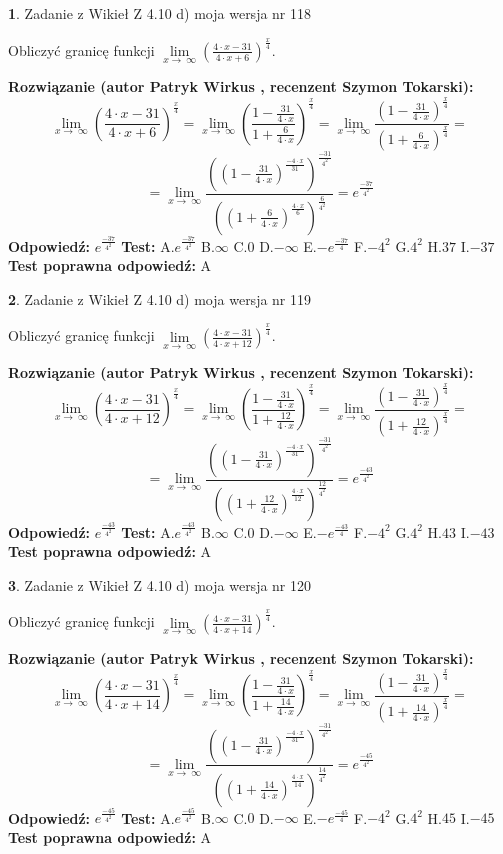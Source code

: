 \documentclass[12pt, a4paper]{article}
\theoremstyle{definition} %
\newtheorem{zad}{}
\newcommand{\zadStart}[1]{\begin{zad}#1\newline}
\newcommand{\zadStop}{\end{zad}}
\newcommand{\rozwStart}[2]{\noindent \textbf{Rozwiązanie (autor #1 , recenzent #2): }\newline}
\newcommand{\rozwStop}{\newline}
\newcommand{\odpStart}{\noindent \textbf{Odpowiedź:}\newline}
\newcommand{\odpStop}{\newline}
\newcommand{\testStart}{\noindent \textbf{Test:}\newline}
\newcommand{\testStop}{\newline}
\newcommand{\kluczStart}{\noindent \textbf{Test poprawna odpowiedź:}\newline}
\newcommand{\kluczStop}{\newline}
\begin{document}
\zadStart{Zadanie z Wikieł Z 4.10 d) moja wersja nr 118}


Obliczyć granicę funkcji  $\lim\limits_{x\to\ \infty}(\frac{4\cdot x-31}{4\cdot x+6})^{\frac{x}{4}}$.
\zadStop
\rozwStart{Patryk Wirkus}{Szymon Tokarski}
$$\lim\limits_{x\to\ \infty}(\frac{4\cdot x-31}{4\cdot x+6})^{\frac{x}{4}} = \lim\limits_{x\to\ \infty}(\frac{1-\frac{31}{4\cdot x}}{1+\frac{6}{4\cdot x}})^{\frac{x}{4}}=\lim\limits_{x\to\ \infty}\frac{(1-\frac{31}{4\cdot x})^{\frac{x}{4}}}{(1+\frac{6}{4\cdot x})^{\frac{x}{4}}}=$$
$$=\lim\limits_{x\to\ \infty}\frac{((1-\frac{31}{4\cdot x})^{\frac{-4\cdot x}{31}})^{\frac{-31}{4^{2}}}}{((1+\frac{6}{4\cdot x})^{\frac{4\cdot x}{6}})^{\frac{6}{4^{2}}}}=e^{\frac{-37}{4^{2}}}$$
\rozwStop
\odpStart
$e^{\frac{-37}{4^{2}}}$
\odpStop
\testStart
A.$e^{\frac{-37}{4^{2}}}$ B.$\infty$ C.$0$ D.$-\infty$ E.$-e^{\frac{-37}{4}}$
F.$-4^{2}$ G.$4^{2}$
H.$37$
I.$-37$
\testStop
\kluczStart
A
\kluczStop



\zadStart{Zadanie z Wikieł Z 4.10 d) moja wersja nr 119}


Obliczyć granicę funkcji  $\lim\limits_{x\to\ \infty}(\frac{4\cdot x-31}{4\cdot x+12})^{\frac{x}{4}}$.
\zadStop
\rozwStart{Patryk Wirkus}{Szymon Tokarski}
$$\lim\limits_{x\to\ \infty}(\frac{4\cdot x-31}{4\cdot x+12})^{\frac{x}{4}} = \lim\limits_{x\to\ \infty}(\frac{1-\frac{31}{4\cdot x}}{1+\frac{12}{4\cdot x}})^{\frac{x}{4}}=\lim\limits_{x\to\ \infty}\frac{(1-\frac{31}{4\cdot x})^{\frac{x}{4}}}{(1+\frac{12}{4\cdot x})^{\frac{x}{4}}}=$$
$$=\lim\limits_{x\to\ \infty}\frac{((1-\frac{31}{4\cdot x})^{\frac{-4\cdot x}{31}})^{\frac{-31}{4^{2}}}}{((1+\frac{12}{4\cdot x})^{\frac{4\cdot x}{12}})^{\frac{12}{4^{2}}}}=e^{\frac{-43}{4^{2}}}$$
\rozwStop
\odpStart
$e^{\frac{-43}{4^{2}}}$
\odpStop
\testStart
A.$e^{\frac{-43}{4^{2}}}$ B.$\infty$ C.$0$ D.$-\infty$ E.$-e^{\frac{-43}{4}}$
F.$-4^{2}$ G.$4^{2}$
H.$43$
I.$-43$
\testStop
\kluczStart
A
\kluczStop



\zadStart{Zadanie z Wikieł Z 4.10 d) moja wersja nr 120}


Obliczyć granicę funkcji  $\lim\limits_{x\to\ \infty}(\frac{4\cdot x-31}{4\cdot x+14})^{\frac{x}{4}}$.
\zadStop
\rozwStart{Patryk Wirkus}{Szymon Tokarski}
$$\lim\limits_{x\to\ \infty}(\frac{4\cdot x-31}{4\cdot x+14})^{\frac{x}{4}} = \lim\limits_{x\to\ \infty}(\frac{1-\frac{31}{4\cdot x}}{1+\frac{14}{4\cdot x}})^{\frac{x}{4}}=\lim\limits_{x\to\ \infty}\frac{(1-\frac{31}{4\cdot x})^{\frac{x}{4}}}{(1+\frac{14}{4\cdot x})^{\frac{x}{4}}}=$$
$$=\lim\limits_{x\to\ \infty}\frac{((1-\frac{31}{4\cdot x})^{\frac{-4\cdot x}{31}})^{\frac{-31}{4^{2}}}}{((1+\frac{14}{4\cdot x})^{\frac{4\cdot x}{14}})^{\frac{14}{4^{2}}}}=e^{\frac{-45}{4^{2}}}$$
\rozwStop
\odpStart
$e^{\frac{-45}{4^{2}}}$
\odpStop
\testStart
A.$e^{\frac{-45}{4^{2}}}$ B.$\infty$ C.$0$ D.$-\infty$ E.$-e^{\frac{-45}{4}}$
F.$-4^{2}$ G.$4^{2}$
H.$45$
I.$-45$
\testStop
\kluczStart
A
\kluczStop
\end{document}
